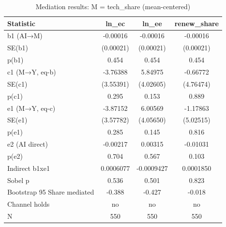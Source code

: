 \begin{table}[htbp]
\centering
\caption{Mediation results: M = tech_share (mean-centered)}
\begin{tabular}{lccc}
\toprule
Statistic & ln\_ec & ln\_ee & renew\_share \\
\midrule
b1 (AI→M) & -0.00016 & -0.00016 & -0.00016 \\
SE(b1) & (0.00021) & (0.00021) & (0.00021) \\
p(b1) & 0.454 & 0.454 & 0.454 \\
c1 (M→Y, eq-b) & -3.76388 & 5.84975 & -0.66772 \\
SE(c1) & (3.55391) & (4.02605) & (4.76474) \\
p(c1) & 0.295 & 0.153 & 0.889 \\
e1 (M→Y, eq-c) & -3.87152 & 6.00569 & -1.17863 \\
SE(e1) & (3.57782) & (4.05650) & (5.02515) \\
p(e1) & 0.285 & 0.145 & 0.816 \\
e2 (AI direct) & -0.00217 & 0.00315 & -0.01031 \\
p(e2) & 0.704 & 0.567 & 0.103 \\
Indirect b1xe1 & 0.0006077 & -0.0009427 & 0.0001850 \\
Sobel p & 0.536 & 0.501 & 0.823 \\
Bootstrap 95%
Share mediated & -0.388 & -0.427 & -0.018 \\
Channel holds & no & no & no \\
\midrule
N & 550 & 550 & 550 \\
\bottomrule
\end{tabular}
\label{tab:h2_tech_share__mean_centered_}
\end{table}
